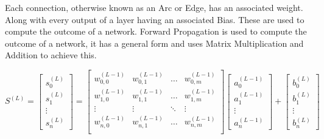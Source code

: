 \begin{flushleft}
                        Each connection, otherwise known as an Arc or Edge, has an associated weight. Along with every output of a
                        layer having an associated Bias. These are used to compute the outcome of a network.
                        \vspace{0.2cm}
                        Forward Propagation is used to compute the outcome of a network, it has a general form and uses 
                        Matrix Multiplication and Addition to achieve this.
                        \vspace{0.2cm}
                        
                        \begin{center}
                            $
                            S^{(L)} = 
                            \begin{bmatrix}
                            s^{(L)}_{0} \\
                            s^{(L)}_{1} \\
                            \vdots      \\
                            s^{(L)}_{n} 
                            \end{bmatrix}
                            = 
                            \begin{bmatrix}
                            w^{(L-1)}_{0,0} & w^{(L-1)}_{0,1} & \hdots  & w^{(L-1)}_{0,m} \\
                            w^{(L-1)}_{1,0} & w^{(L-1)}_{1,1} & \hdots  & w^{(L-1)}_{1,m} \\
                            \vdots          & \vdots          & \ddots  & \vdots          \\
                            w^{(L-1)}_{n,0} & w^{(L-1)}_{n,1} & \hdots  & w^{(L-1)}_{n,m} \\
                            \end{bmatrix}
                            \begin{bmatrix}
                            a^{(L-1)}_{0} \\
                            a^{(L-1)}_{1} \\
                            \vdots      \\
                            a^{(L-1)}_{n} 
                            \end{bmatrix}
                            +
                            \begin{bmatrix}
                            b^{(L)}_{0} \\
                            b^{(L)}_{1} \\
                            \vdots      \\
                            b^{(L)}_{n} 
                            \end{bmatrix}
                            $ 
                        \end{center}
                        

\end{flushleft}
